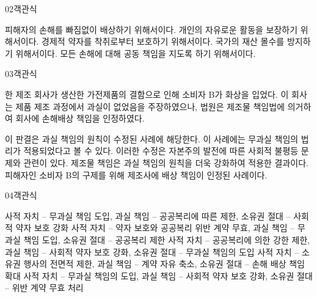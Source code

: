 \documentclass[fs85,seriesWit]{korfarm-base}
\begin{document}
\begin{kfQBlock}{02}{객관식}
\begin{kfChoices}
\kfChoice 피해자의 손해를 빠짐없이 배상하기 위해서이다.
\kfChoice 개인의 자유로운 활동을 보장하기 위해서이다.
\kfChoice 경제적 약자를 착취로부터 보호하기 위해서이다.
\kfChoice 국가의 재산 몰수를 방지하기 위해서이다.
\kfChoice 모든 손해에 대해 공동 책임을 지도록 하기 위해서이다.
\end{kfChoices}
\end{kfQBlock}

\begin{kfQBlock}{03}{객관식}
\begin{kfEvidence}한 제조 회사가 생산한 가전제품의 결함으로 인해 소비자 B가 화상을 입었다. 이 회사는 제품 제조 과정에서 과실이 없었음을 주장하였으나, 법원은 제조물 책임법에 의거하여 회사에 손해배상 책임을 인정하였다.\end{kfEvidence}
\begin{kfChoices}
\kfChoice 이 판결은 과실 책임의 원칙이 수정된 사례에 해당한다.
\kfChoice 이 사례에는 무과실 책임의 법리가 적용되었다고 볼 수 있다.
\kfChoice 이러한 수정은 자본주의 발전에 따른 사회적 불평등 문제와 관련이 있다.
\kfChoice 제조물 책임은 과실 책임의 원칙을 더욱 강화하여 적용한 결과이다.
\kfChoice 피해자인 소비자 B의 구제를 위해 제조사에 배상 책임이 인정된 사례이다.
\end{kfChoices}
\end{kfQBlock}

\begin{kfQBlock}{04}{객관식}
\begin{kfChoices}
\kfChoice 사적 자치 -- 무과실 책임 도입, 과실 책임 -- 공공복리에 따른 제한, 소유권 절대 -- 사회적 약자 보호 강화
\kfChoice 사적 자치 -- 약자 보호와 공공복리 위반 계약 무효, 과실 책임 -- 무과실 책임 도입, 소유권 절대 -- 공공복리 제한
\kfChoice 사적 자치 -- 공공복리에 의한 강한 제한, 과실 책임 -- 사회적 약자 보호 강화, 소유권 절대 -- 무과실 책임의 도입
\kfChoice 사적 자치 -- 소유권 행사의 전면적 제한, 과실 책임 -- 계약 자유 축소, 소유권 절대 -- 손해 배상 책임 확대
\kfChoice 사적 자치 -- 무과실 책임의 도입, 과실 책임 -- 사회적 약자 보호 강화, 소유권 절대 -- 위반 계약 무효 처리
\end{kfChoices}
\end{kfQBlock}
\end{document}
